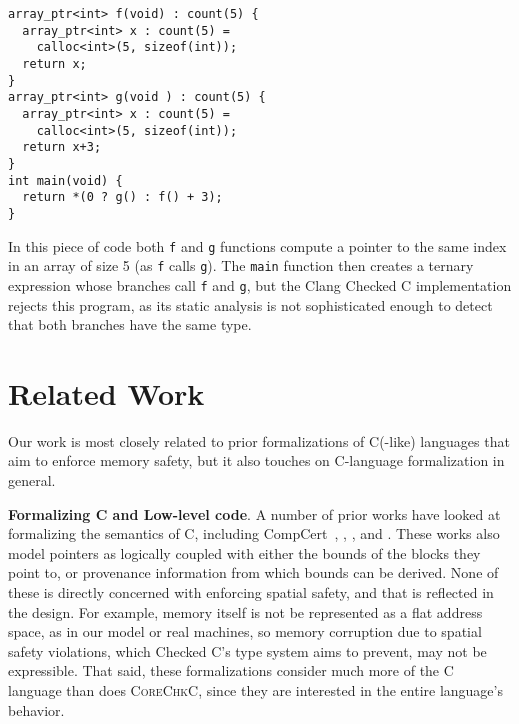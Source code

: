 \documentclass[conference]{IEEEtran}
\newcommand{\myparagraph}[1]{\textbf{#1}.\xspace}
\newcommand{\code}[1]{\lstinline|#1|}
\newcommand{\lang}{\textsc{CoreChkC}\xspace}
\begin{document}
{\small 
\begin{lstlisting}[xleftmargin=4 mm]
array_ptr<int> f(void) : count(5) {
  array_ptr<int> x : count(5) =
    calloc<int>(5, sizeof(int)); 
  return x;
}
array_ptr<int> g(void ) : count(5) {
  array_ptr<int> x : count(5) =
    calloc<int>(5, sizeof(int)); 
  return x+3;
}
int main(void) {
  return *(0 ? g() : f() + 3);
}    
\end{lstlisting}
}\noindent
In this piece of code both \code{f} and \code{g} functions compute a
pointer to the same index in an array of size 5 (as \code{f} calls
\code{g}). The \code{main} function then creates a ternary expression
whose branches call \code{f} and \code{g}, but the Clang Checked C
implementation rejects this program, as its static analysis is not
sophisticated enough to detect that both branches have the same type.














 \section{Related Work}
\label{sec:related}

Our work is most closely related to prior formalizations of C(-like)
languages that aim to enforce memory safety, but it also touches on
C-language formalization in general.


\myparagraph{Formalizing C and Low-level code}
A number of prior works have looked at formalizing the semantics of C,
including CompCert~\cite{Blazy2009,leroy:hal-00703441},
\citet{ellison-rosu-2012-popl}, \citet{Kang:2015:FCM:2813885.2738005},
and \citet{10.1145/2980983.2908081, Memarian:2019:ECS:3302515.3290380}. These works also model
pointers as logically coupled with either the bounds of the blocks
they point to, or provenance information from which bounds can be
derived. None of these is directly concerned with enforcing
spatial safety, and that is reflected in the design. For example,
memory itself is not be represented as a flat address space, as in our
model or real machines, so memory corruption due to spatial safety
violations, which Checked C's type system aims to prevent, may not be
expressible. That said, these formalizations consider much more of the
C language than does \lang, since they are interested in the entire
language's behavior.
\end{document}

